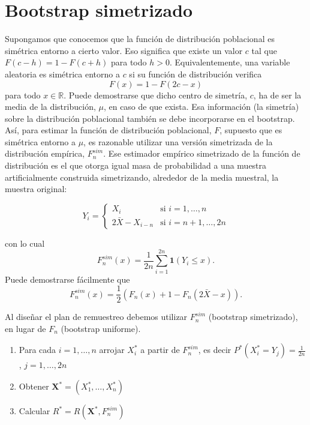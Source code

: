 \documentclass[
]{book}
\theoremstyle{definition}
\theoremstyle{definition}
\theoremstyle{definition}
\theoremstyle{remark}
\begin{document}
\hypertarget{bootstrap-simetrizado}{%
\section{Bootstrap simetrizado}\label{bootstrap-simetrizado}}

Supongamos que conocemos que la función de distribución poblacional es
simétrica entorno a cierto valor. Eso significa que existe un valor \(c\)
tal que \(F\left( c-h \right) =1-F\left( c+h \right)\) para todo \(h>0\).
Equivalentemente, una variable aleatoria es simétrica entorno a \(c\) si
su función de distribución verifica
\[F\left( x \right) = 1 - F\left( 2c - x \right)\]
para todo \(x\in \mathbb{R}\). Puede demostrarse que dicho
centro de simetría, \(c\), ha de ser la media de la distribución,
\(\mu\), en caso de que exista. Esa información (la simetría) sobre la
distribución poblacional también se debe incorporarse en el bootstrap.
Así, para estimar la función de distribución poblacional, \(F\), supuesto
que es simétrica entorno a \(\mu\), es razonable utilizar una versión
simetrizada de la distribución empírica, \(F_n^{sim}\). Ese estimador
empírico simetrizado de la función de distribución es el que otorga
igual masa de probabilidad a una muestra artificialmente construida
simetrizando, alrededor de la media muestral, la muestra original:

\[Y_i=\left\{ 
\begin{array}{ll}
X_i & \text{si } i=1,\ldots ,n \\ 
2\bar{X}-X_{i-n} &\text{si } i=n+1,\ldots ,2n
\end{array}
\right.\]

con lo cual
\[F_n^{sim}\left( x \right) =\frac{1}{2n}\sum_{i=1}^{2n}\mathbf{1}\left( Y_i\leq x \right).\]
Puede demostrarse fácilmente que
\[F_n^{sim}\left( x \right) =\frac{1}{2}\left( F_n\left( x \right)
+1-F_n\left( 2\bar{X}-x \right) \right).\]

Al diseñar el plan de remuestreo debemos utilizar \(F_n^{sim}\)
(bootstrap simetrizado), en lugar de \(F_n\) (bootstrap uniforme).

\begin{enumerate}
\def\labelenumi{\arabic{enumi}.}
\item
  Para cada \(i=1,\ldots ,n\) arrojar \(X_i^{\ast}\) a partir de
  \(F_n^{sim}\), es decir
  \(P^{\ast}\left( X_i^{\ast}=Y_j \right) =\frac{1 }{2n}\), \(j=1,\ldots ,2n\)
\item
  Obtener \(\mathbf{X}^{\ast}=\left( X_1^{\ast},\ldots ,X_n^{\ast} \right)\)
\item
  Calcular
  \(R^{\ast}=R\left( \mathbf{X}^{\ast},F_n^{sim} \right)\)
\end{enumerate}
\end{document}
